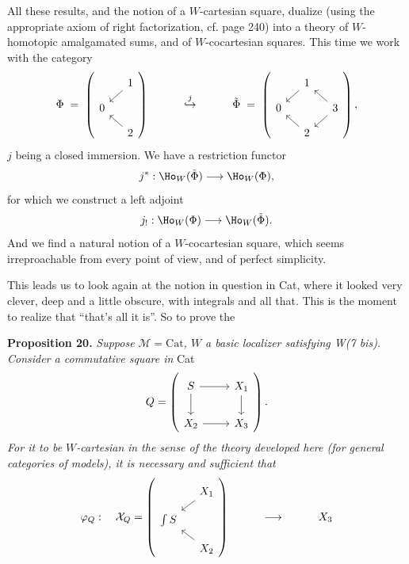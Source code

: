 
All these results, and the notion of a $W$-cartesian square, dualize (using the appropriate axiom of right factorization, cf. page 240) into a theory of $W$-homotopic amalgamated sums, and of $W$-cocartesian squares. This time we work with the category
\[
\Phi \;=\; \left(
\begin{tikzcd}[ampersand replacement=\&, row sep=small, column sep=small]
 \& 1 \arrow[dl] \\
0 \& \\
 \& 2 \arrow[ul]
\end{tikzcd}
\right)
\qquad\quad \overset{j}{\hookrightarrow} \qquad\quad
\tilde{\Phi} \;=\; \left(
\begin{tikzcd}[ampersand replacement=\&, row sep=small, column sep=small]
 \& 1 \arrow[dl] \& \\
0 \& \& 3 \arrow[ul] \arrow[dl] \\
 \& 2 \arrow[ul] \&
\end{tikzcd}
\right),
\]
$j$ being a closed immersion. We have a restriction functor
\[
j^* : \Ho_W(\tilde{\Phi}) \longrightarrow \Ho_W(\Phi),
\]
for which we construct a left adjoint
\[
j_! : \Ho_W(\Phi) \longrightarrow \Ho_W(\tilde{\Phi}).
\]
And we find a natural notion of a
$W$-cocartesian square, which seems irreproachable from every point of view, and of perfect simplicity. %

This leads us to look again at the notion in question in Cat, where it looked very clever, deep and a little obscure, with integrals and all that. This is the moment to realize that ``that's all it is''. So to prove the

\textbf{Proposition 20.} \textit{Suppose} $\mathcal{M} = \mathrm{Cat}$\textit{, $W$ a basic localizer satisfying W(7 bis). Consider a commutative square in} Cat
\[
Q = \left(
\begin{tikzcd}[ampersand replacement=\&]
S \arrow[r] \arrow[d] \& X_1 \arrow[d] \\
X_2 \arrow[r] \& X_3
\end{tikzcd}
\right).
\]
\textit{For it to be $W$-cartesian} \textit{in the sense of the theory developed here (for general categories of models), it is necessary and sufficient that}
\[
\varphi_Q : \quad \mathcal{X}_Q = \left(
\begin{tikzcd}[ampersand replacement=\&, row sep=small, column sep=small]
 \& X_1 \arrow[dl] \\
\int S \& \\
 \& X_2 \arrow[ul]
\end{tikzcd}
\right) \qquad\quad \longrightarrow \qquad\quad X_3
\]

